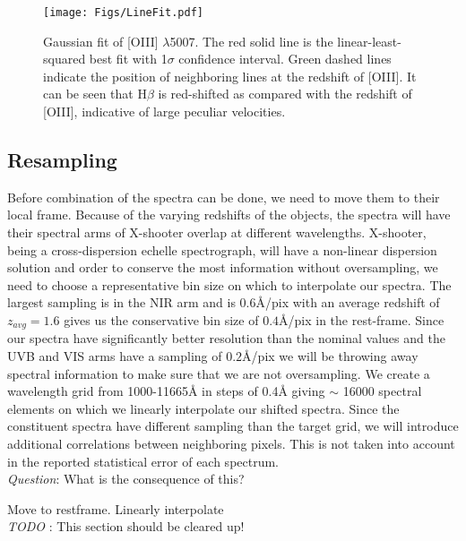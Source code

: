 \documentclass{aa}    %
\newcommand{\figlabel}[1]{\label{fig:#1}}
\newcommand{\sectlabel}[1]{\label{sect:#1}}
\newcommand{\todo}[3]{{\color{#2}\emph{#1}: #3}}
\newcommand{\jstodo}[1]{\todo{ \\TODO }{green}{#1}}
\newcommand{\qtodo}[1]{\todo{\\ Question}{red}{#1}}
\begin{document}
\begin{figure}[hbtp]
  \centering
  \texttt{[image: Figs/LineFit.pdf]}
  \caption[]{Gaussian fit of [OIII] $\lambda$5007. The red solid line is the linear-least-squared best fit with 1$\sigma$ confidence interval. Green dashed lines indicate the position of neighboring lines at the redshift of [OIII]. It can be seen that H$\beta$ is red-shifted as compared with the redshift of [OIII], indicative of large peculiar velocities.}
  \figlabel{linefit}
\end{figure}





\subsection{Resampling} \sectlabel{rebin}


Before combination of the spectra can be done, we need to move them to their local frame. Because of the varying redshifts of the objects, the spectra will have their spectral arms of X-shooter overlap at different wavelengths. X-shooter, being a cross-dispersion echelle spectrograph, will have a non-linear dispersion solution and order to conserve the most information without oversampling, we need to choose a representative bin size on which to interpolate our spectra. The largest sampling is in the NIR arm and is $0.6$\r{A}/pix with an average redshift of $z_{avg} = 1.6$ gives us the conservative bin size of $0.4$\r{A}/pix in the rest-frame. Since our spectra have significantly better resolution than the nominal values and the UVB and VIS arms have a sampling of $0.2$\r{A}/pix we will be throwing away spectral information to make sure that we are not oversampling. We create a wavelength grid from 1000-11665\r{A} in steps of 0.4\r{A} giving $\sim$ 16000 spectral elements on which we linearly interpolate our shifted spectra. Since the constituent spectra have different sampling than the target grid, we will introduce additional correlations between neighboring pixels. This is not taken into account in the reported statistical error of each spectrum.  \qtodo{What is the consequence of this?}


Move to restframe. Linearly interpolate \jstodo{This section should be cleared up!}
\end{document}

